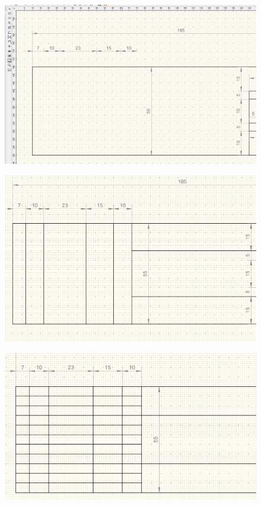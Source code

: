 \begin{enumerate}[leftmargin=*]
\begin{figure}[!htb]
    \centering \includegraphics[width=0.9\linewidth]{./images/lab2/seventh_step.png}
    \caption{}
    \label{fig:lab2:seventh_step} 
  \end{figure}
  \begin{figure}[!htb]
    \centering \includegraphics[width=0.9\linewidth]{./images/lab2/eighth_step.png}
    \caption{}
    \label{fig:lab2:eigth_step} 
  \end{figure}
  \begin{figure}[!htb]
    \centering \includegraphics[width=0.9\linewidth]{./images/lab2/nineth_step.png}
    \caption{}
    \label{fig:lab2:nineth_step} 
  \end{figure}


\end{enumerate}
